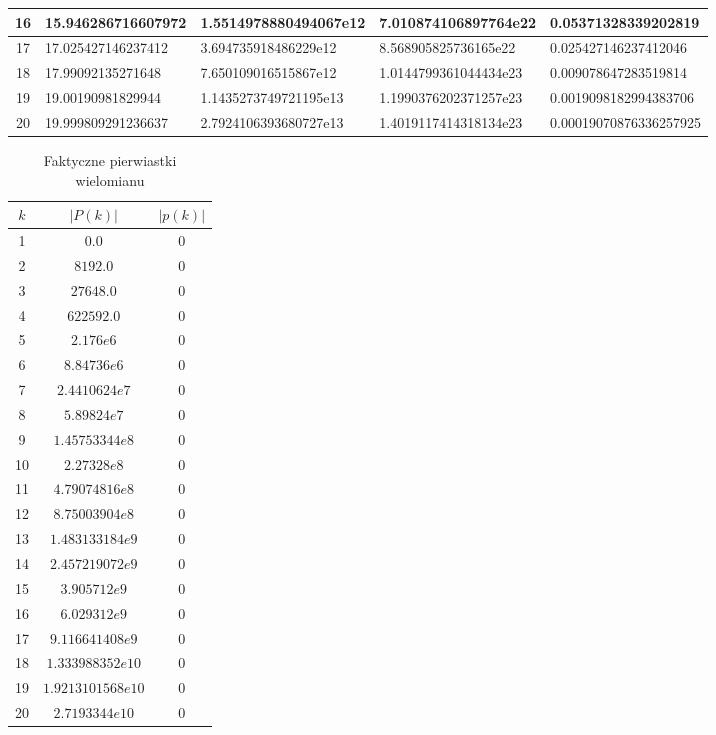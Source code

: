 \documentclass[10pt,a4paper, polish]{article}
\begin{document}
\begin{table}[H]
\begin{tabular}{|c|p{3cm}|p{3.4cm}|p{3.4cm}|p{3.5cm}|}
\hline
16 & 15.946286716607972 & 1.5514978880494067e12 & 7.010874106897764e22 & 0.05371328339202819 \\
\hline
17 & 17.025427146237412 & 3.694735918486229e12 & 8.568905825736165e22 & 0.025427146237412046 \\
\hline
18 & 17.99092135271648 & 7.650109016515867e12 & 1.0144799361044434e23 & 0.009078647283519814 \\
\hline
19 & 19.00190981829944 & 1.1435273749721195e13 & 1.1990376202371257e23 & 0.0019098182994383706 \\
\hline
20 & 19.999809291236637 & 2.7924106393680727e13 & 1.4019117414318134e23 & 0.00019070876336257925 \\
\hline
\end{tabular}
\end{table}

\begin{table}[H]
\centering
\caption{Faktyczne pierwiastki wielomianu}
\begin{tabular}{|c|c|c|}
\hline
$k$ & $|P(k)|$ & $|p(k)|$ \\
\hline
1 & $0.0$ & $0$ \\
\hline
2 & $8192.0$ & $0$ \\
\hline
3 & $27648.0$ & $0$ \\
\hline
4 & $622592.0$ & $0$ \\
\hline
5 & $2.176e6$ & $0$ \\
\hline
6 & $8.84736e6$ & $0$ \\
\hline
7 & $2.4410624e7$ & $0$ \\
\hline
8 & $5.89824e7$ & $0$ \\
\hline
9 & $1.45753344e8$ & $0$ \\
\hline
10 & $2.27328e8$ & $0$ \\
\hline
11 & $4.79074816e8$ & $0$ \\
\hline
12 & $8.75003904e8$ & $0$ \\
\hline
13 & $1.483133184e9$ & $0$ \\
\hline
14 & $2.457219072e9$ & $0$ \\
\hline
15 & $3.905712e9$ & $0$ \\
\hline
16 & $6.029312e9$ & $0$ \\
\hline
17 & $9.116641408e9$ & $0$ \\
\hline
18 & $1.333988352e10$ & $0$ \\
\hline
19 & $1.9213101568e10$ & $0$ \\
\hline
20 & $2.7193344e10$ & $0$ \\
\hline
\end{tabular}
\end{table}
\end{document}
